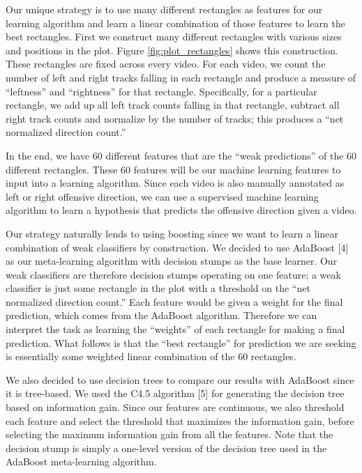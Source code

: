 \documentclass{article} %
\begin{document}
Our unique strategy is to use many different rectangles as features for our learning algorithm and learn a linear combination of those features to learn the best rectangles. First we construct many different rectangles with various sizes and positions in the plot. Figure \ref{fig:plot_rectangles} shows this construction. These rectangles are fixed across every video. For each video, we count the number of left and right tracks falling in each rectangle and produce a measure of ``leftness'' and ``rightness'' for that rectangle. Specifically, for a particular rectangle, we add up all left track counts falling in that rectangle, subtract all right track counts and normalize by the number of tracks; this produces a ``net normalized direction count.''

In the end, we have 60 different features that are the ``weak predictions'' of the 60 different rectangles. These 60 features will be our machine learning features to input into a learning algorithm. Since each video is also manually annotated as left or right offensive direction, we can use a supervised machine learning algorithm to learn a hypothesis that predicts the offensive direction given a video.

Our strategy naturally lends to using boosting since we want to learn a linear combination of weak classifiers by construction. We decided to use AdaBoost [4] as our meta-learning algorithm with decision stumps as the base learner. Our weak classifiers are therefore decision stumps operating on one feature; a weak classifier is just some rectangle in the plot with a threshold on the ``net normalized direction count.'' Each feature would be given a weight for the final prediction, which comes from the AdaBoost algorithm. Therefore we can interpret the task as learning the ``weights'' of each rectangle for making a final prediction. What follows is that the ``best rectangle'' for prediction we are seeking is essentially some weighted linear combination of the 60 rectangles.

We also decided to use decision trees to compare our results with AdaBoost since it is tree-based. We used the C4.5 algorithm [5] for generating the decision tree based on information gain. Since our features are continuous, we also threshold each feature and select the threshold that maximizes the information gain, before selecting the maximum information gain from all the features. Note that the decision stump is simply a one-level version of the decision tree used in the AdaBoost meta-learning algorithm.
\end{document}
